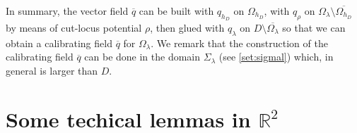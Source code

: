\documentclass[reqno,11pt]{amsart}
\theoremstyle{definition}
\numberwithin{equation}{section}
\def\ov{\overline}
\newcommand{\RR}{\mathbb{R}}
\def\R{\mathbb{R}}
\newcommand{\ps}[1]{\langle #1\rangle}
\newcommand{\1}{{{\bf 1}\kern-0,28em\rm l}}
\def\sepa{\; : \;}
\def\n{{\bf n}}
\newcommand{\aco}[1]{\left\{#1\right\}}
\begin{document}
In summary, the vector field $\ov q$ can be built with $q_{h_D}$ on $\Omega_{h_D}$, with $q_\rho$ on $\Omega_\lambda\setminus \ov{\Omega_{h_D}}$ by means of cut-locus potential $\rho$, then glued with $q_\lambda$ on $D\setminus \ov{\Omega_\lambda}$  so that we can obtain a calibrating field $\ov q$ for $\Omega_\lambda$. We remark  that the  construction of the calibrating field $\ov q$ can be done in the  domain $\Sigma_\lambda$ (see \eqref{set:sigmal}) which, in general is larger than $D$. 



\appendix
\section{Some techical lemmas in $\R^2$}\label{A} 
\end{document}
